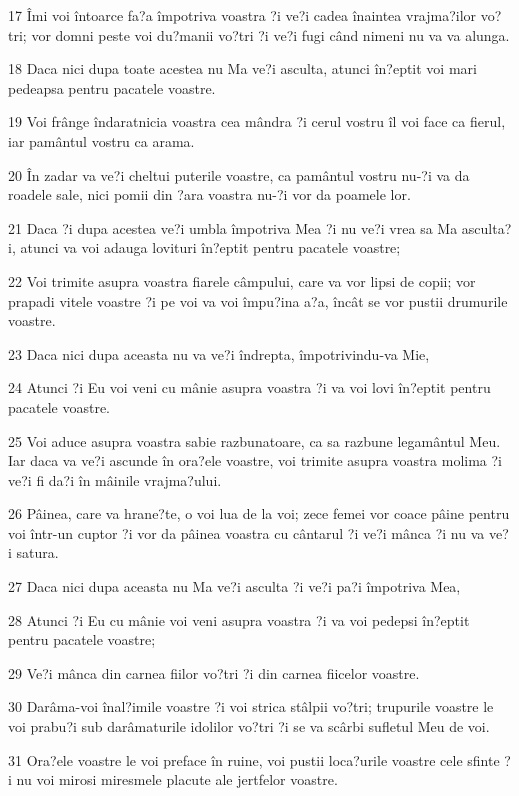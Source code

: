 \par 17 Îmi voi întoarce fa?a împotriva voastra ?i ve?i cadea înaintea vrajma?ilor vo?tri; vor domni peste voi du?manii vo?tri ?i ve?i fugi când nimeni nu va va alunga.
\par 18 Daca nici dupa toate acestea nu Ma ve?i asculta, atunci în?eptit voi mari pedeapsa pentru pacatele voastre.
\par 19 Voi frânge îndaratnicia voastra cea mândra ?i cerul vostru îl voi face ca fierul, iar pamântul vostru ca arama.
\par 20 În zadar va ve?i cheltui puterile voastre, ca pamântul vostru nu-?i va da roadele sale, nici pomii din ?ara voastra nu-?i vor da poamele lor.
\par 21 Daca ?i dupa acestea ve?i umbla împotriva Mea ?i nu ve?i vrea sa Ma asculta?i, atunci va voi adauga lovituri în?eptit pentru pacatele voastre;
\par 22 Voi trimite asupra voastra fiarele câmpului, care va vor lipsi de copii; vor prapadi vitele voastre ?i pe voi va voi împu?ina a?a, încât se vor pustii drumurile voastre.
\par 23 Daca nici dupa aceasta nu va ve?i îndrepta, împotrivindu-va Mie,
\par 24 Atunci ?i Eu voi veni cu mânie asupra voastra ?i va voi lovi în?eptit pentru pacatele voastre.
\par 25 Voi aduce asupra voastra sabie razbunatoare, ca sa razbune legamântul Meu. Iar daca va ve?i ascunde în ora?ele voastre, voi trimite asupra voastra molima ?i ve?i fi da?i în mâinile vrajma?ului.
\par 26 Pâinea, care va hrane?te, o voi lua de la voi; zece femei vor coace pâine pentru voi într-un cuptor ?i vor da pâinea voastra cu cântarul ?i ve?i mânca ?i nu va ve?i satura.
\par 27 Daca nici dupa aceasta nu Ma ve?i asculta ?i ve?i pa?i împotriva Mea,
\par 28 Atunci ?i Eu cu mânie voi veni asupra voastra ?i va voi pedepsi în?eptit pentru pacatele voastre;
\par 29 Ve?i mânca din carnea fiilor vo?tri ?i din carnea fiicelor voastre.
\par 30 Darâma-voi înal?imile voastre ?i voi strica stâlpii vo?tri; trupurile voastre le voi prabu?i sub darâmaturile idolilor vo?tri ?i se va scârbi sufletul Meu de voi.
\par 31 Ora?ele voastre le voi preface în ruine, voi pustii loca?urile voastre cele sfinte ?i nu voi mirosi miresmele placute ale jertfelor voastre.

